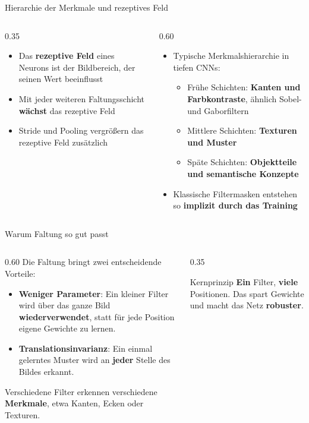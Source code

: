 {%
\begin{frame}{Hierarchie der Merkmale und rezeptives Feld}
\begin{columns}[T]
\begin{column}{0.35\textwidth}
\begin{itemize}
    \item Das \textbf{rezeptive Feld} eines Neurons ist der Bildbereich, der seinen Wert beeinflusst
    \item Mit jeder weiteren Faltungsschicht \textbf{wächst} das rezeptive Feld
    \item Stride und Pooling vergrößern das rezeptive Feld zusätzlich
\end{itemize}
\end{column}
\begin{column}{0.60\textwidth}
\begin{itemize}
    \item Typische Merkmalshierarchie in tiefen CNNs:
    \begin{itemize}
        \item Frühe Schichten: \textbf{Kanten und Farbkontraste}, ähnlich Sobel- und Gaborfiltern
        \item Mittlere Schichten: \textbf{Texturen und Muster}
        \item Späte Schichten: \textbf{Objektteile und semantische Konzepte}
    \end{itemize}
    \item Klassische Filtermasken entstehen so \textbf{implizit durch das Training}
\end{itemize}
\end{column}
\end{columns}
\end{frame}


\begin{frame}{Warum Faltung so gut passt}
\begin{columns}
\begin{column}{0.60\textwidth}
Die Faltung bringt zwei entscheidende Vorteile:
\begin{itemize}
\item \textbf{Weniger Parameter}: Ein kleiner Filter wird über das ganze Bild \textbf{wiederverwendet}, statt für jede Position eigene Gewichte zu lernen.
\item \textbf{Translationsinvarianz}: Ein einmal gelerntes Muster wird an \textbf{jeder} Stelle des Bildes erkannt.
\end{itemize}
Verschiedene Filter erkennen verschiedene \textbf{Merkmale}, etwa Kanten, Ecken oder Texturen.
\end{column}
\begin{column}{0.35\textwidth}
\begin{block}{Kernprinzip}
\textbf{Ein} Filter, \textbf{viele} Positionen. Das spart Gewichte und macht das Netz \textbf{robuster}.
\end{block}
\end{column}
\end{columns}
\end{frame}

\makequestionspage{\FRAGENIMAGE}
}


